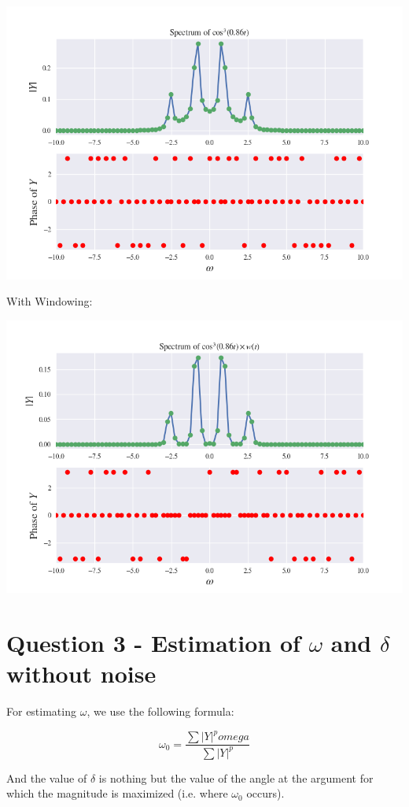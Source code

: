 \documentclass[12pt]{article}
\begin{document}
\begin{center}
    \includegraphics[scale=0.7]{images/fig9.png}
\end{center}
With Windowing:
\begin{center}
    \includegraphics[scale=0.7]{images/fig10.png}
\end{center}
\pagebreak

\section{Question 3 - Estimation of $\omega$ and $\delta$ without noise}

For estimating $\omega$, we use the following formula:

$$\omega_0 = \frac{\sum |Y|^p omega}{\sum |Y|^p}$$

And the value of $\delta$ is nothing but the value of the angle at the argument for which the magnitude is maximized (i.e. where $\omega_0$ occurs).
\end{document}
